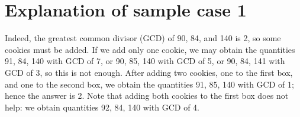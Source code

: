 \section*{Explanation of sample case 1}
Indeed, the greatest common divisor (GCD) of 90, 84, and 140 is 2, so some cookies must be added.
If we add only one cookie, we may obtain the quantities 91, 84, 140 with GCD of 7,
or 90, 85, 140 with GCD of 5, or 90, 84, 141 with GCD of 3, so this is not enough.
After adding two cookies, one to the first box, and one to the second box, we obtain the quantities 91, 85, 140 with GCD of 1; hence the answer is 2.
Note that adding both cookies to the first box does not help: we obtain quantities 92, 84, 140 with GCD of 4.
